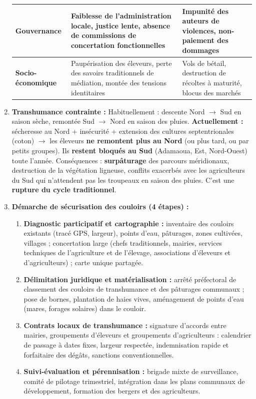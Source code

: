 \documentclass[11pt]{article}
\begin{document}
\begin{exoresolu}
\begin{enumerate}
\begin{center}
\begin{tabularx}{\linewidth}{|l|X|X|}
    \textbf{Gouvernance} & Faiblesse de l'administration locale, justice lente, absence de commissions de concertation fonctionnelles & Impunité des auteurs de violences, non-paiement des dommages \\ \hline
    \textbf{Socio-économique} & Paupérisation des éleveurs, perte des savoirs traditionnels de médiation, montée des tensions identitaires & Vols de bétail, destruction de récoltes à maturité, blocus des marchés \\ \hline
    \end{tabularx}
    \end{center}
    \item \textbf{Transhumance contrainte :}
    Habituellement : descente Nord $\rightarrow$ Sud en saison sèche, remontée Sud $\rightarrow$ Nord en saison des pluies.
    \textbf{Actuellement :} sécheresse au Nord + insécurité + extension des cultures septentrionales (coton) $\rightarrow$ les éleveurs \textbf{ne remontent plus au Nord} (ou plus tard, ou par petits groupes). Ils \textbf{restent bloqués au Sud} (Adamaoua, Est, Nord-Ouest) toute l'année. Conséquences : \textbf{surpâturage} des parcours méridionaux, destruction de la végétation ligneuse, conflits exacerbés avec les agriculteurs du Sud qui n'attendent pas les troupeaux en saison des pluies. C'est une \textbf{rupture du cycle traditionnel}.
    \item \textbf{Démarche de sécurisation des couloirs (4 étapes) :}
    \begin{enumerate}
        \item \textbf{Diagnostic participatif et cartographie :} inventaire des couloirs existants (tracé GPS, largeur), points d'eau, pâturages, zones cultivées, villages ; concertation large (chefs traditionnels, mairies, services techniques de l'agriculture et de l'élevage, associations d'éleveurs et d'agriculteurs) ; carte unique partagée.
        \item \textbf{Délimitation juridique et matérialisation :} arrêté préfectoral de classement des couloirs de transhumance et des pâturages communaux ; pose de bornes, plantation de haies vives, aménagement de points d'eau (mares, forages solaires) dans le couloir.
        \item \textbf{Contrats locaux de transhumance :} signature d'accords entre mairies, groupements d'éleveurs et groupements d'agriculteurs : calendrier de passage à dates fixes, largeur respectée, indemnisation rapide et forfaitaire des dégâts, sanctions conventionnelles.
        \item \textbf{Suivi-évaluation et pérennisation :} brigade mixte de surveillance, comité de pilotage trimestriel, intégration dans les plans communaux de développement, formation des bergers et des agriculteurs.

\end{enumerate}
\end{enumerate}
\end{exoresolu}
\end{document}
